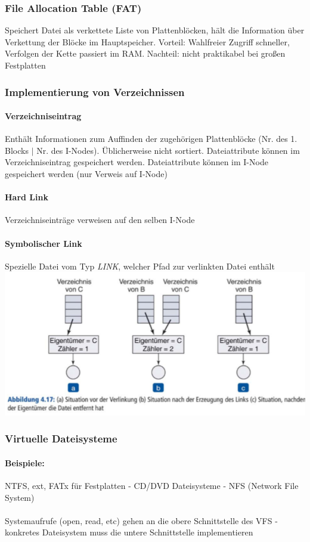 \documentclass[11pt,a4paper,landscape]{article}
\begin{document}
\begin{multicols*}{3}
	\subsubsection{File Allocation Table (FAT)}
	Speichert Datei als verkettete Liste von Plattenblöcken, hält die Information über Verkettung der Blöcke im Hauptspeicher. Vorteil: Wahlfreier Zugriff schneller, Verfolgen der Kette passiert im RAM. Nachteil: nicht praktikabel bei großen Festplatten
	\subsubsection{Implementierung von Verzeichnissen}
	\paragraph{Verzeichniseintrag} Enthält Informationen zum Auffinden der zugehörigen Plattenblöcke (Nr. des 1. Blocks $\vert$ Nr. des I-Nodes). Üblicherweise nicht sortiert. Dateiattribute können im Verzeichniseintrag gespeichert werden. Dateiattribute können im I-Node gespeichert werden (nur Verweis auf I-Node)
	\paragraph{Hard Link} Verzeichniseinträge verweisen auf den selben I-Node
	\paragraph{Symbolischer Link} Spezielle Datei vom Typ \textit{LINK}, welcher Pfad zur verlinkten Datei enthält\\
	\includegraphics[width=0.8\columnwidth]{link}
	\subsubsection{Virtuelle Dateisysteme}
	\paragraph{Beispiele:} NTFS, ext, FATx für Festplatten - CD/DVD Dateisysteme - NFS (Network File System)\\\\
	Systemaufrufe (open, read, etc) gehen an die obere Schnittstelle des VFS - konkretes Dateisystem muss die untere Schnittstelle implementieren

\end{multicols*}
\end{document}
